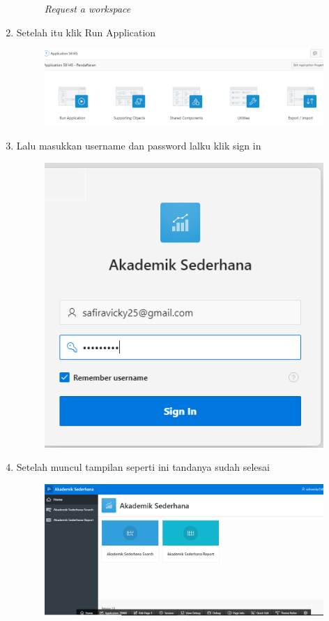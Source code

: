 \begin{enumerate}
\begin{figure}[!htbp]
    \label{gambar 7}
     \caption{\textit{Request a workspace}}
\end{figure}
\item Setelah itu klik Run Application
\begin{figure}[!htbp]
    \centering
    \includegraphics[scale=0.5]{figure/17.PNG}
    \label{gambar 7}
     \caption{\textit{}}
\end{figure} \vspace{6cm}
\item Lalu masukkan username dan password lalku klik sign in
\begin{figure}[!htbp]
    \centering
    \includegraphics[scale=0.5]{figure/27.PNG}
    \label{gambar 7}
     \caption{\textit{}}
\end{figure}
\item Setelah muncul tampilan seperti ini tandanya sudah selesai
\begin{figure}[!htbp]
    \centering
    \includegraphics[scale=0.5]{figure/28.PNG}
    \label{gambar 7}
     \caption{\textit{}}
\end{figure}
\end{enumerate}
